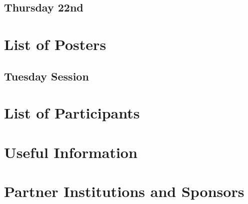 \documentclass[openany, parskip=full, 12pt, a4]{scrbook}
\begin{document}











\section{Thursday 22nd}



\chapter{List of Posters} 

\vspace{-2.5em}

\section{Tuesday Session}











\chapter{List of Participants}
 

 
\chapter{Useful Information}



\chapter{Partner Institutions and Sponsors}



\newpage


\pagecolor{myblue}
\thispagestyle{empty}
\mbox{}
\end{document}
